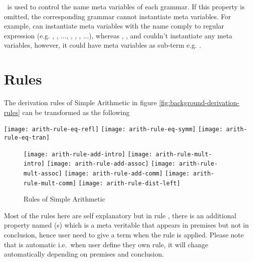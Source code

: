 \documentclass[master.tex]{subfiles}
\begin{document}
\kMetaVarRegex\ is used to control the name meta variables of each grammar. If
this property is omitted, the corresponding grammar cannot instantiate meta
variables. For example,  can instantiate meta variables with the name
comply to regular expression \pregex{\texttt{[a-z][0-9]*}} (e.g. , ,
$\ldots$, , , , $\ldots$), whereas ,
, and  couldn't instantiate any meta variables,
however, it could have meta variables as sub-term e.g. 
.

\section{Rules}

The derivation rules of Simple Arithmetic in figure \ref{fig:background-derivation-rules}
can be transformed as the following

\begin{center}
\begin{minipage}{0.6\textwidth}
    \texttt{[image: arith-rule-eq-refl]}
    \texttt{[image: arith-rule-eq-symm]}
    \texttt{[image: arith-rule-eq-tran]}
\end{minipage}
\end{center}

\begin{figure}[H]
    \centering
\begin{minipage}{0.6\textwidth}
    \texttt{[image: arith-rule-add-intro]}
    \texttt{[image: arith-rule-mult-intro]}
    \texttt{[image: arith-rule-add-assoc]}
    \texttt{[image: arith-rule-mult-assoc]}
    \texttt{[image: arith-rule-add-comm]}
    \texttt{[image: arith-rule-mult-comm]}
    \texttt{[image: arith-rule-dist-left]}
\end{minipage}
    \caption{Rules of Simple Arithmetic}
\label{fig:arith-rules}
\end{figure}

Most of the rules here are self explanatory but in rule , there
is an additional property named \kParameter{}(s) which is a meta veritable that
appears in premises but not in conclusion, hence user need to give a term when
the rule is applied. Please note that \kParameter{} is automatic i.e.\ when user
define they own rule, it will change automatically depending on premises and
conclusion.
\end{document}
